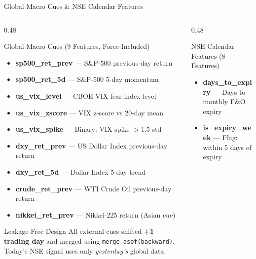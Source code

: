 \documentclass[aspectratio=43,11pt]{beamer}
\begin{document}
\begin{frame}[shrink=12]{Global Macro Cues \& NSE Calendar Features}
    \begin{columns}[T]
        \begin{column}{0.48\textwidth}
            \begin{block}{Global Macro Cues (9 Features, Force-Included)}
                \footnotesize\setlength{\itemsep}{1pt}
                \begin{itemize}
                    \item \textbf{sp500\_ret\_prev} --- S\&P-500 previous-day return
                    \item \textbf{sp500\_ret\_5d} --- S\&P-500 5-day momentum
                    \item \textbf{us\_vix\_level} --- CBOE VIX fear index level
                    \item \textbf{us\_vix\_zscore} --- VIX z-score vs 20-day mean
                    \item \textbf{us\_vix\_spike} --- Binary: VIX spike $>$1.5 std
                    \item \textbf{dxy\_ret\_prev} --- US Dollar Index previous-day return
                    \item \textbf{dxy\_ret\_5d} --- Dollar Index 5-day trend
                    \item \textbf{crude\_ret\_prev} --- WTI Crude Oil previous-day return
                    \item \textbf{nikkei\_ret\_prev} --- Nikkei-225 return (Asian cue)
                \end{itemize}
            \end{block}
            \begin{alertblock}{Leakage-Free Design}
                \footnotesize All external cues shifted \textbf{+1 trading day} and merged using \texttt{merge\_asof(backward)}. Today's NSE signal uses only \emph{yesterday's} global data.
            \end{alertblock}
        \end{column}
        \begin{column}{0.48\textwidth}
            \begin{block}{NSE Calendar Features (8 Features)}
                \footnotesize\setlength{\itemsep}{1pt}
                \begin{itemize}
                    \item \textbf{days\_to\_expiry} --- Days to monthly F\&O expiry
                    \item \textbf{is\_expiry\_week} --- Flag: within 5 days of expiry

\end{itemize}
\end{block}
\end{column}
\end{columns}
\end{frame}
\end{document}
